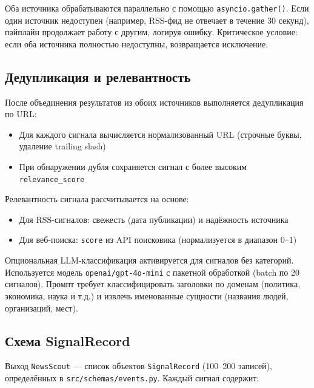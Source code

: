 Оба источника обрабатываются параллельно с помощью \texttt{asyncio.gather()}. Если один источник недоступен (например, RSS-фид не отвечает в течение 30 секунд), пайплайн продолжает работу с другим, логируя ошибку. Критическое условие: если оба источника полностью недоступны, возвращается исключение.


\subsection{Дедупликация и релевантность}

После объединения результатов из обоих источников выполняется дедупликация по URL:

\begin{itemize}
    \item Для каждого сигнала вычисляется нормализованный URL (строчные буквы, удаление trailing slash)
    \item При обнаружении дубля сохраняется сигнал с более высоким \texttt{relevance\_score}
\end{itemize}

Релевантность сигнала рассчитывается на основе:
\begin{itemize}
    \item Для RSS-сигналов: свежесть (дата публикации) и надёжность источника
    \item Для веб-поиска: \texttt{score} из API поисковика (нормализуется в диапазон 0--1)
\end{itemize}

Опциональная LLM-классификация активируется для сигналов без категорий. Используется модель \texttt{openai/gpt-4o-mini} с пакетной обработкой (batch по 20 сигналов). Промпт требует классифицировать заголовки по доменам (политика, экономика, наука и т.д.) и извлечь именованные сущности (названия людей, организаций, мест).


\subsection{Схема SignalRecord}

Выход \texttt{NewsScout} --- список объектов \texttt{SignalRecord} (100--200 записей), определённых в \texttt{src/schemas/events.py}. Каждый сигнал содержит:


